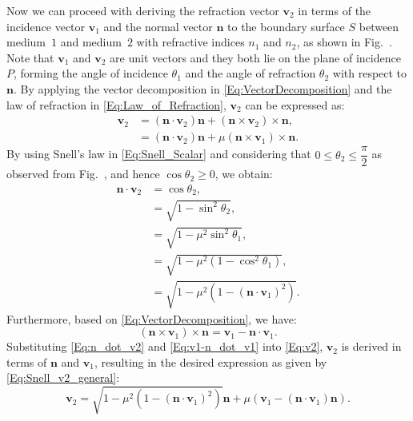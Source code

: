 \documentclass[lettersize,journal]{IEEEtran}
\begin{document}
Now we can proceed with deriving the refraction vector $\mathbf{v}_2$ in terms of the incidence vector $\mathbf{v}_1$ and the normal vector $\mathbf{n}$ to the boundary surface $S$ between medium~$1$ and medium~$2$ with refractive indices $n_1$ and $n_2$, as shown in Fig.~. Note that $\mathbf{v}_1$ and $\mathbf{v}_2$ are unit vectors and they both lie on the plane of incidence $P$, forming the angle of incidence $\theta_1$ and the angle of refraction $\theta_2$ with respect to $\mathbf{n}$. By applying the vector decomposition in \eqref{Eq:VectorDecomposition} and the law of refraction in \eqref{Eq:Law_of_Refraction}, $\mathbf{v}_2$ can be expressed as:
%
\begin{equation}
\begin{aligned}
    \mathbf{v}_2 &= \left(\mathbf{n}\cdot\mathbf{v}_2\right)\mathbf{n}+\left(\mathbf{n}\times\mathbf{v}_2\right)\times\mathbf{n}, \\
                 &= \left(\mathbf{n}\cdot\mathbf{v}_2\right)\mathbf{n}+\mu\left(\mathbf{n}\times\mathbf{v}_1\right)\times\mathbf{n}.
\label{Eq:v2}
\end{aligned}
\end{equation}
%
By using Snell's law in \eqref{Eq:Snell_Scalar} and considering that $0\leq\theta_2\leq\dfrac{\pi}{2}$ as observed from Fig.~,  and hence $\cos\theta_2\geq0$, we obtain:
%
\begin{equation}
\begin{aligned}
    \mathbf{n}\cdot\mathbf{v}_2 &= \cos\theta_2, \\
                                &= \sqrt{1-\sin^2\theta_2}, \\
                                &= \sqrt{1-\mu^2\sin^2\theta_1}, \\
                                &= \sqrt{1-\mu^2\left(1-\cos^2\theta_1\right)}, \\
                                &= \sqrt{1-\mu^2\left(1-\left(\mathbf{n}\cdot\mathbf{v}_1\right)^2\right)}.
\end{aligned}
\label{Eq:n_dot_v2}
\end{equation}
%
Furthermore, based on \eqref{Eq:VectorDecomposition}, we have:
%
\begin{equation}
    \left(\mathbf{n}\times\mathbf{v}_1\right)\times\mathbf{n} = \mathbf{v}_1-\mathbf{n}\cdot\mathbf{v}_1.
    \label{Eq:v1-n_dot_v1}
\end{equation}
%
Substituting \eqref{Eq:n_dot_v2} and \eqref{Eq:v1-n_dot_v1} into \eqref{Eq:v2}, $\mathbf{v}_2$ is derived in terms of $\mathbf{n}$ and $\mathbf{v}_1$, resulting in the desired expression as given by \eqref{Eq:Snell_v2_general}:
%
\begin{equation}
   \mathbf{v}_2 = \sqrt{1-\mu^2\left(1-\left(\mathbf{n}{\cdot}\mathbf{v}_1 \right)^2\right)}\mathbf{n}+\mu\left(\mathbf{v}_1-\left(\mathbf{n}{\cdot}\mathbf{v}_1\right)\mathbf{n}\right).
\end{equation}
%
\end{document}
